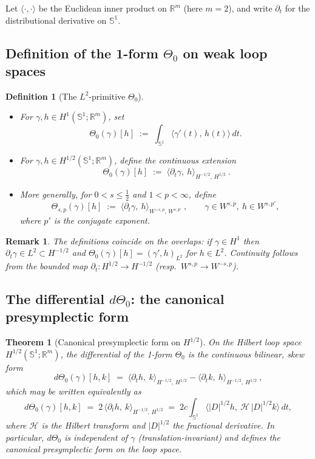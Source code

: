 \documentclass{amsart}
\newcounter{thm}
\newcounter{ex}
\newcounter{re}
\newtheorem{theorem}[thm]{Theorem}
\newtheorem{remark}[thm]{Remark}
\newtheorem{definition}[thm]{Definition}
\begin{document}
Let $\langle\cdot,\cdot\rangle$ be the Euclidean inner product on $\mathbb R^m$ (here $m=2$),
and write $\partial_t$ for the distributional derivative on $\mathbb S^1$.

\subsection{Definition of the 1-form $\Theta_0$ on weak loop spaces}

\begin{definition}[The $L^2$-primitive $\Theta_0$]\label{def:Theta0}
\leavevmode
\begin{itemize}
\item For $\gamma,h\in H^{1}(\mathbb S^1;\mathbb R^m)$, set
\[
\Theta_0(\gamma)[h]\;:=\;\int_{\mathbb S^1}\!\langle \gamma'(t),\,h(t)\rangle\,dt.
\]
\item For $\gamma,h\in H^{1/2}(\mathbb S^1;\mathbb R^m)$, define the continuous extension
\[
\boxed{\ \Theta_0(\gamma)[h]\;:=\;\langle \partial_t\gamma,\ h\rangle_{H^{-1/2},\,H^{1/2}}\ }.
\]
\item More generally, for $0<s\le \tfrac12$ and $1<p<\infty$, define
\[
\boxed{\ \Theta_{s,p}(\gamma)[h]\;:=\;\langle \partial_t\gamma,\ h\rangle_{W^{-s,p},\,W^{s,p'}}\ ,\qquad
\gamma\in W^{s,p},\ h\in W^{s,p'},\ }
\]
where $p'$ is the conjugate exponent.
\end{itemize}
\end{definition}

\begin{remark}
The definitions coincide on the overlaps: if $\gamma\in H^1$ then
$\partial_t\gamma\in L^2\subset H^{-1/2}$ and
$\Theta_0(\gamma)[h]=(\gamma',h)_{L^2}$ for $h\in L^2$.
Continuity follows from the bounded map $\partial_t:H^{1/2}\to H^{-1/2}$ (resp.\ $W^{s,p}\to W^{-s,p}$).
\end{remark}

\subsection{The differential $d\Theta_0$: the canonical presymplectic form}

\begin{theorem}[Canonical presymplectic form on $H^{1/2}$]\label{th:presymp-Hhalf}
On the Hilbert loop space $H^{1/2}(\mathbb S^1;\mathbb R^m)$,
the differential of the 1-form $\Theta_0$ is the continuous bilinear, skew form
\[
\boxed{\ d\Theta_0(\gamma)[h,k]\;=\;
\langle \partial_t h,\ k\rangle_{H^{-1/2},\,H^{1/2}}
-\langle \partial_t k,\ h\rangle_{H^{-1/2},\,H^{1/2}}\ ,\ }
\]
which may be written equivalently as
\[
d\Theta_0(\gamma)[h,k]\;=\;2\,\langle \partial_t h,\ k\rangle_{H^{-1/2},\,H^{1/2}}
\;=\;2c\int_{\mathbb S^1}\!\langle |D|^{1/2}h,\ \mathcal H\,|D|^{1/2}k\rangle\,dt,
\]
where $\mathcal H$ is the Hilbert transform and $|D|^{1/2}$ the fractional derivative.
In particular, $d\Theta_0$ is independent of $\gamma$ (translation-invariant) and defines
the \emph{canonical presymplectic form} on the loop space.
\end{theorem}
\end{document}
